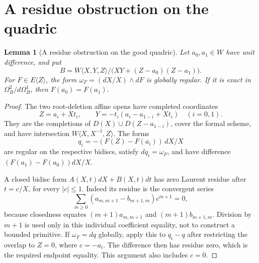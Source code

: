\documentclass[11pt,a4paper]{article}
\newtheorem{lemma}[theorem]{Lemma}
\theoremstyle{remark}
\begin{document}
\section{A residue obstruction on the quadric}
\begin{lemma}[A residue obstruction on the good quadric]
\label{lem:tcreviewresidue}
Let $a_0,a_1\in W$ have unit difference, and put
\[
 B=W\langle X,Y,Z\rangle/
           \bigl(XY+(Z-a_0)(Z-a_1)\bigr).
\]
For $F\in E\langle Z\rangle$, the form
$\omega_F=(dX/X)\wedge dF$ is globally regular. If it is exact in
$\Omega_B^2/d\Omega_B^1$, then $F(a_0)=F(a_1)$.
\end{lemma}
\begin{proof}
The two root-deletion affine opens have completed coordinates
\[
 Z=a_i+Xt_i,\qquad
 Y=-t_i(a_i-a_{1-i}+Xt_i)\quad(i=0,1).
\]
They are the completions of $D(X)\cup D(Z-a_{1-i})$, cover the formal
scheme, and have intersection $W\langle X,X^{-1},Z\rangle$.
The forms
\[
 q_i=-(F(Z)-F(a_i))\,dX/X
\]
are regular on the respective bidiscs, satisfy $dq_i=\omega_F$, and
have difference $(F(a_1)-F(a_0))dX/X$.

A closed bidisc form $A(X,t)dX+B(X,t)dt$ has zero Laurent residue
after $t=c/X$, for every $|c|\le1$. Indeed its residue is the
convergent series
\[
 \sum_{m\ge0}(a_{m,m+1}-b_{m+1,m})c^{m+1}=0,
\]
because closedness equates $(m+1)a_{m,m+1}$ and
$(m+1)b_{m+1,m}$. Division by $m+1$ is used only in this individual
coefficient equality, not to construct a bounded primitive.
If $\omega_F=dq$ globally, apply this to $q_i-q$ after restricting
the overlap to $Z=0$, where $c=-a_i$. The difference then has residue
zero, which is the required endpoint equality. This argument also includes $c=0$.
\end{proof}
\end{document}
